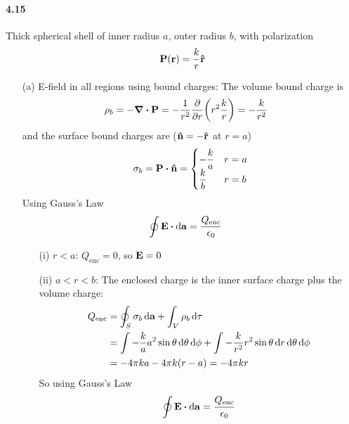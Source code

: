 \documentclass[../main.tex]{subfiles}
\begin{document}
\pagestyle{fancy}

\setcounter{section}{7}

\paragraph{4.15} Thick spherical shell of inner radius $a$, outer radius $b$, with polarization
\begin{align*}
    \vb P (\vb r) = \frac{k}{r} \vu r    
\end{align*}
\begin{itemize}
    \item [(a)] E-field in all regions using bound charges: The volume bound charge is
    \begin{align*}
        \rho_b &= -\div \vb P = - \frac{1}{r^2} \pdv{r}(r^2 \frac{k}{r}) = -\frac{k}{r^2}
    \end{align*}
    and the surface bound charges are ($\vu n = -\vu r$ at $r = a$)
    \begin{align*}
        \sigma_b = \vb P \vdot \vu n = \begin{cases}
            -\dfrac{k}{a} & r = a \\
            \dfrac{k}{b} & r = b
        \end{cases}
    \end{align*}
    Using Gauss's Law
    \begin{align*}
        \oint \vb E \vdot \dd \vb a &= \frac{Q_\text{enc}}{\epsilon_0}
    \end{align*}
    \begin{itemize}
        \item [(i)] $r < a$: $Q_\text{enc} = 0$, so $\vb E = 0$
        \item [(ii)] $a < r < b$: The enclosed charge is the inner surface charge plus the volume charge:
        \begin{align*}
            Q_\text{enc} &= \oint_S \sigma_b \dd{\vb a} + \int_V \rho_b \dd{\tau} \\
            &= \int -\frac{k}{a} a^2 \sin\theta \dd{\theta} \dd{\phi} + \int -\frac{k}{r^2} r^2 \sin\theta \dd{r} \dd{\theta} \dd{\phi} \\
            &= -4\pi k a - 4\pi k (r - a) = -4\pi k r
        \end{align*}
        So using Gauss's Law
        \begin{align*}
            \oint \vb E \vdot \dd{\vb a} &= \frac{Q_\text{enc}}{\epsilon_0} \\

\end{align*}
\end{itemize}
\end{itemize}
\end{document}
